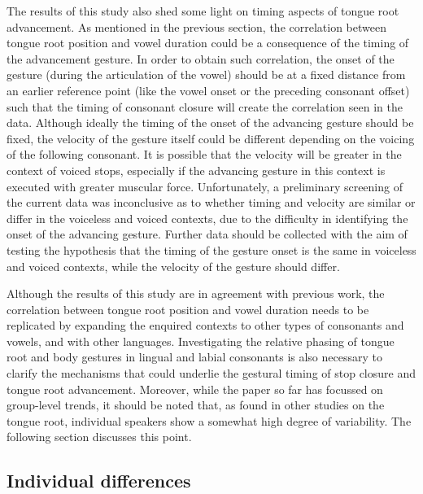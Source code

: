 \documentclass[preprint]{JASAnew}
\begin{document}
The results of this study also shed some light on timing aspects of
tongue root advancement. As mentioned in the previous section, the
correlation between tongue root position and vowel duration could be a
consequence of the timing of the advancement gesture. In order to obtain
such correlation, the onset of the gesture (during the articulation of
the vowel) should be at a fixed distance from an earlier reference point
(like the vowel onset or the preceding consonant offset) such that the
timing of consonant closure will create the correlation seen in the
data. Although ideally the timing of the onset of the advancing gesture
should be fixed, the velocity of the gesture itself could be different
depending on the voicing of the following consonant. It is possible that
the velocity will be greater in the context of voiced stops, especially
if the advancing gesture in this context is executed with greater
muscular force. Unfortunately, a preliminary screening of the current
data was inconclusive as to whether timing and velocity are similar or
differ in the voiceless and voiced contexts, due to the difficulty in
identifying the onset of the advancing gesture. Further data should be
collected with the aim of testing the hypothesis that the timing of the
gesture onset is the same in voiceless and voiced contexts, while the
velocity of the gesture should differ.

Although the results of this study are in agreement with previous work,
the correlation between tongue root position and vowel duration needs to
be replicated by expanding the enquired contexts to other types of
consonants and vowels, and with other languages. Investigating the
relative phasing of tongue root and body gestures in lingual and labial
consonants is also necessary to clarify the mechanisms that could
underlie the gestural timing of stop closure and tongue root
advancement. Moreover, while the paper so far has focussed on
group-level trends, it should be noted that, as found in other studies
on the tongue root, individual speakers show a somewhat high degree of
variability. The following section discusses this point.

\hypertarget{individual-differences}{%
\subsection{Individual differences}\label{individual-differences}}

\label{s:idio}
\end{document}

